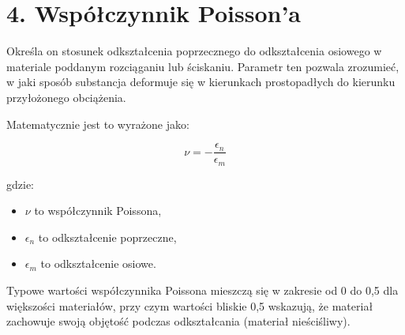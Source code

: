 {}
\justify
\fontsize{14}{16}\selectfont
\setlength{\parindent}{0pt}
\section*{4. Współczynnik Poisson'a \cite{alma991001031769708832}} 
\fontsize{12}{14}\selectfont

\hspace{1.5cm} Określa on stosunek odkształcenia poprzecznego do odkształcenia osiowego w materiale poddanym rozciąganiu lub ściskaniu. Parametr ten pozwala zrozumieć, w jaki sposób substancja deformuje się w kierunkach prostopadłych do kierunku przyłożonego obciążenia.

Matematycznie jest to wyrażone jako:

$$
\nu = -\frac{\epsilon_n}{\epsilon_m}
$$

gdzie:
\begin{itemize}
    \item $\nu$ to współczynnik Poissona,
    \item $\epsilon_n$ to odkształcenie poprzeczne,
    \item $\epsilon_m$ to odkształcenie osiowe.
\end{itemize}

Typowe wartości współczynnika Poissona mieszczą się w zakresie od 0 do 0,5 dla większości materiałów, przy czym wartości bliskie 0,5 wskazują, że materiał zachowuje swoją objętość podczas odkształcania (materiał nieściśliwy).